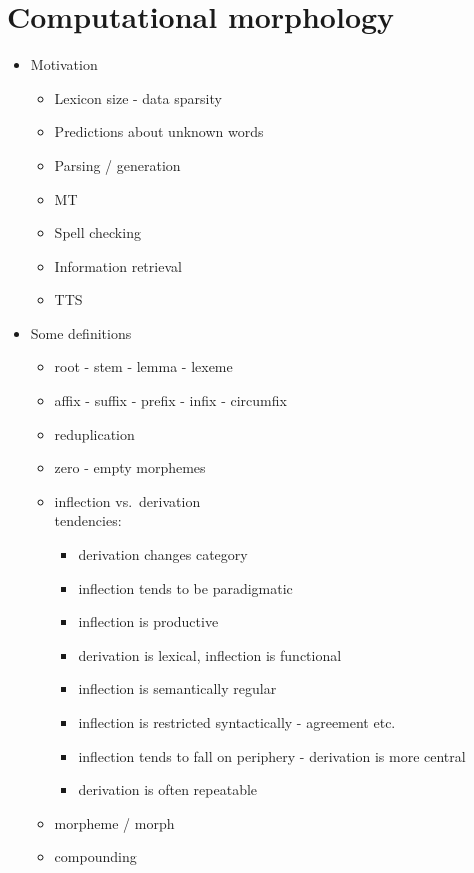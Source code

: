 \chapter{\label{chap:morphology}Computational morphology}

\begin{itemize}
  \item Motivation
    \begin{itemize}
      \item Lexicon size - data sparsity
      \item Predictions about unknown words
      \item Parsing / generation
      \item MT 
      \item Spell checking
      \item Information retrieval
      \item TTS
    \end{itemize}
  \item Some definitions
    \begin{itemize}
      \item root - stem - lemma - lexeme
      \item affix - suffix - prefix - infix - circumfix 
      \item reduplication
      \item zero - empty morphemes
      \item inflection vs.\ derivation\\
        tendencies:
        \begin{itemize}
          \item derivation changes category
          \item inflection tends to be paradigmatic
          \item inflection is productive
          \item derivation is lexical, inflection is functional
          \item inflection is semantically regular
          \item inflection is restricted syntactically - agreement etc.
          \item inflection tends to fall on periphery - derivation is more central
          \item derivation is often repeatable
        \end{itemize}
      \item morpheme / morph
      \item compounding 

\end{itemize}
\end{itemize}
